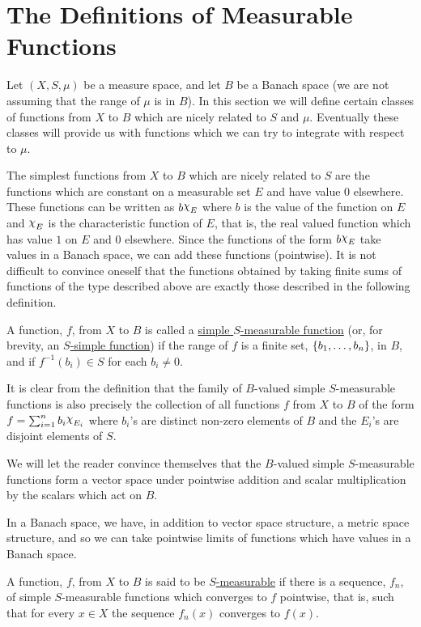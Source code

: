 
\section{The Definitions of Measurable Functions}

Let $(X, S, \mu)$ be a measure space, and let $B$ be a Banach space (we are not assuming that the range of $\mu$ is in $B$). In this section we will define certain classes of functions from $X$ to $B$ which are nicely related to $S$ and $\mu$. Eventually these classes will provide us with functions which we can try to integrate with respect to $\mu$.

The simplest functions from $X$ to $B$ which are nicely related to $S$ are the functions which are constant on a measurable set $E$ and have value 0 elsewhere. These functions can be written as $b\idf{E}$ where $b$ is the value of the function on $E$ and $\idf{E}$ is the characteristic function of $E$, that is, the real valued function which has value $1$ on $E$ and 0 elsewhere. Since the functions of the form $b\idf{E}$ take values in a Banach space, we can add these functions (pointwise). It is not difficult to convince oneself that the functions obtained by taking finite sums of functions of the type described above are exactly those described in the following definition.

\begin{definition}
A function, $f$, from $X$ to $B$ is called a \underline{simple $S$-measurable function} (or, for brevity, an \underline{$S$-simple function}) if the range of $f$ is a finite set, $\left\{b_1, \dots, b_n\right\}$, in $B$, and if $f^{-1}(b_i)\in S$ for each $b_i\neq0$.
\end{definition}

It is clear from the definition that the family of $B$-valued simple $S$-measurable functions is also precisely the collection of all functions $f$ from $X$ to $B$ of the form $f=\sum_{i=1}^nb_i\idf{E_i}$ where $b_i$'s are distinct non-zero elements of $B$ and the $E_i$'s are disjoint elements of $S$.

We will let the reader convince themselves that the $B$-valued simple $S$-measurable functions form a vector space under pointwise addition and scalar multiplication by the scalars which act on $B$.

In a Banach space, we have, in addition to vector space structure, a metric space structure, and so we can take pointwise limits of functions which have values in a Banach space.

\begin{definition}
A function, $f$, from $X$ to $B$ is said to be \underline{$S$-measurable} if there is a sequence, $f_n$, of simple $S$-measurable functions which converges to $f$ pointwise, that is, such that for every $x\in X$ the sequence $f_n(x)$ converges to $f(x)$.
\end{definition}

